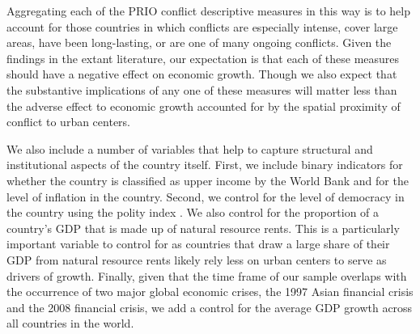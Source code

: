 
Aggregating each of the PRIO conflict descriptive measures in this way is to help account for those countries in which conflicts are especially intense, cover large areas, have been long-lasting, or are one of many ongoing conflicts. Given the findings in the extant literature, our expectation is that each of these measures should have a negative effect on economic growth. Though we also expect that the substantive implications of any one of these measures will matter less than the adverse effect to economic growth accounted for by the spatial proximity of conflict to urban centers.

We also include a number of variables that help to capture structural and institutional aspects of the country itself. First, we include binary indicators for whether the country is classified as upper income by the World Bank and for the level of inflation in the country. Second, we control for the level of democracy in the country using the polity index \citep{marshall:etal:2013}. We also control for the proportion of a country's GDP that is made up of natural resource rents. This is a particularly important variable to control for as countries that draw a large share of their GDP from natural resource rents likely rely less on urban centers to serve as drivers of growth. Finally, given that the time frame of our sample overlaps with the occurrence of two major global economic crises, the 1997 Asian financial crisis and the 2008 financial crisis, we add a control for the average GDP growth across all countries in the world. 

